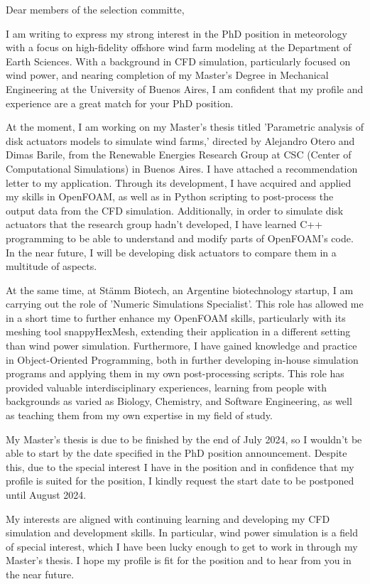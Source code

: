 \documentclass{letter}
\newcommand{\thesisname}{Parametric analysis of disk actuators models to simulate wind farms}
\begin{document}
\begin{letter}{}
\opening{Dear members of the selection committe,}
I am writing to express my strong interest in the PhD position in meteorology with a focus on high-fidelity offshore wind farm modeling at the Department of Earth Sciences.
  With a background in CFD simulation, particularly focused on wind power, and nearing completion of my Master's Degree in Mechanical Engineering at the University of Buenos Aires, I am confident that my profile and experience are a great match for your PhD position.

At the moment, I am working on my Master's thesis titled '\thesisname,' directed by Alejandro Otero and Dimas Barile, from the Renewable Energies Research Group at CSC (Center of Computational Simulations) in Buenos Aires. 
  I have attached a recommendation letter to my application. 
  Through its development, I have acquired and applied my skills in OpenFOAM, as well as in Python scripting to post-process the output data from the CFD simulation. 
  Additionally, in order to simulate disk actuators that the research group hadn't developed, I have learned C++ programming to be able to understand and modify parts of OpenFOAM's code. 
  In the near future, I will be developing disk actuators to compare them in a multitude of aspects.

At the same time, at Stämm Biotech, an Argentine biotechnology startup, I am carrying out the role of 'Numeric Simulations Specialist'. 
  This role has allowed me in a short time to further enhance my OpenFOAM skills, particularly with its meshing tool snappyHexMesh, extending their application in a different setting than wind power simulation. 
  Furthermore, I have gained knowledge and practice in Object-Oriented Programming, both in further developing in-house simulation programs and applying them in my own post-processing scripts. 
  This role has provided valuable interdisciplinary experiences, learning from people with backgrounds as varied as Biology, Chemistry, and Software Engineering, as well as teaching them from my own expertise in my field of study.

  My Master's thesis is due to be finished by the end of July 2024, so I wouldn't be able to start by the date specified in the PhD position announcement. 
  Despite this, due to the special interest I have in the position and in confidence that my profile is suited for the position, I kindly request the start date to be postponed until August 2024.

  My interests are aligned with continuing learning and developing my CFD simulation and development skills. 
  In particular, wind power simulation is a field of special interest, which I have been lucky enough to get to work in through my Master's thesis. 
  I hope my profile is fit for the position and to hear from you in the near future.


\end{letter}
\end{document}
